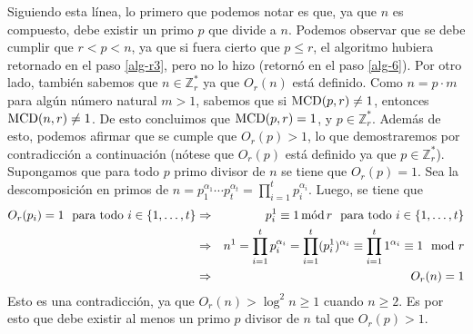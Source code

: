 \documentclass[10pt]{article}
\newcommand{\0}{\mathbf{0}}
\newcommand{\1}{\mathbf{1}}
\newcommand{\mods}{\,\text{\rm mód}\,}
\newcommand{\MCD}{{\rm MCD}}
\newcommand{\+}{\oplus}
\newcommand{\comentario}[1]{}
\theoremstyle{remark}
\theoremstyle{remark}
\begin{document}
	
	Siguiendo esta línea, lo primero que podemos notar es que, ya que $n$ es compuesto, debe existir un primo $p$ que divide a $n$. Podemos observar que se debe cumplir que $r<p<n$, ya que si fuera cierto que $p\leq r$, el algoritmo hubiera retornado en el paso \ref{alg-r3}, 
		pero no lo hizo (retornó en el paso \ref{alg-6}). Por otro lado, también sabemos que 
		$n\in\mathbb{Z}_r^*$ ya que $O_r(n)$ está definido. Como $n=p\cdot m$ para algún número natural $m > 1$, sabemos que si $\MCD(p,r)\neq 1$, entonces $\MCD(n,r)\neq 1$. De esto concluimos que $\MCD(p,r)=1$, y $p\in \mathbb{Z}_r^*$.
	Además de esto, podemos afirmar que se cumple que $O_r(p)>1$, lo que demostraremos por contradicción a continuación (nótese que $O_r(p)$ está definido ya que $p \in \mathbb{Z}_r^*$). Supongamos que para todo $p$ primo divisor de $n$ se tiene que $O_r(p)=1$.	Sea la descomposición en primos de $n=p_1^{\alpha_1}\cdots p_t^{\alpha_t}=\prod_{i = 1}^t p_i^{\alpha_i}$. Luego, 
	se tiene que
		\begin{eqnarray*}
			O_r(p_i)=1 \ \text{ para todo } i \in \{1, \ldots, t\} &\Rightarrow &p_i^1 \equiv 1 \mods r \ \text{ para todo } i \in \{1, \ldots, t\}\\
			&\Rightarrow &n^1= \prod_{i=1}^t p_i^{\alpha_i} =\prod_{i = 1}^t (p_i^1)^{\alpha_i}\equiv \prod_{i = 1}^t 1^{\alpha_i}\equiv 1 \mod r\\
			&\Rightarrow &O_r(n)=1
		\end{eqnarray*}		 
		Esto es una contradicción, ya que $O_r(n)>\log^2n\geq 1$ cuando $n\geq 2$. Es por esto que debe existir al menos un primo $p$ divisor de $n$ tal que $O_r(p)>1$. 
		
\end{document}
